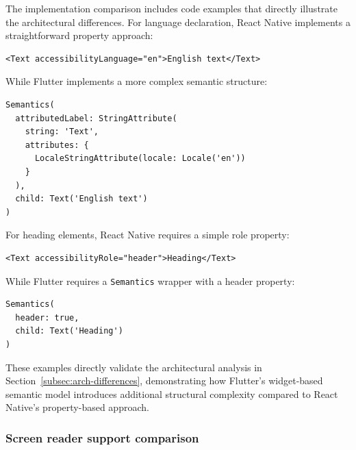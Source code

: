 {\FloatBarrier

The implementation comparison includes code examples that directly illustrate the architectural differences. For language declaration, React Native implements a straightforward property approach:

\begin{lstlisting}[style=ReactNativeStyle, caption=React Native language declaration, label=lst:react-native-language, basicstyle=\ttfamily\footnotesize]
<Text accessibilityLanguage="en">English text</Text>
\end{lstlisting}

\FloatBarrier

While Flutter implements a more complex semantic structure:

\begin{lstlisting}[style=DartStyle, caption=Flutter language declaration, label=lst:flutter-language, basicstyle=\ttfamily\footnotesize]
Semantics(
  attributedLabel: StringAttribute(
    string: 'Text',
    attributes: {
      LocaleStringAttribute(locale: Locale('en'))
    }
  ),
  child: Text('English text')
)
\end{lstlisting}

\FloatBarrier

For heading elements, React Native requires a simple role property:

\begin{lstlisting}[style=ReactNativeStyle, caption=React Native heading element, label=lst:react-native-heading, basicstyle=\ttfamily\footnotesize]
<Text accessibilityRole="header">Heading</Text>
\end{lstlisting}

\FloatBarrier

While Flutter requires a \texttt{Semantics} wrapper with a header property:

\begin{lstlisting}[style=DartStyle, caption=Flutter heading element, label=lst:flutter-heading, basicstyle=\ttfamily\footnotesize]
Semantics(
  header: true,
  child: Text('Heading')
)
\end{lstlisting}

\FloatBarrier

These examples directly validate the architectural analysis in Section~\ref{subsec:arch-differences}, demonstrating how Flutter's widget-based semantic model introduces additional structural complexity compared to React Native's property-based approach.

\subsubsection{Screen reader support comparison}
\label{subsubsec:screen-reader-support-comparison}

}
